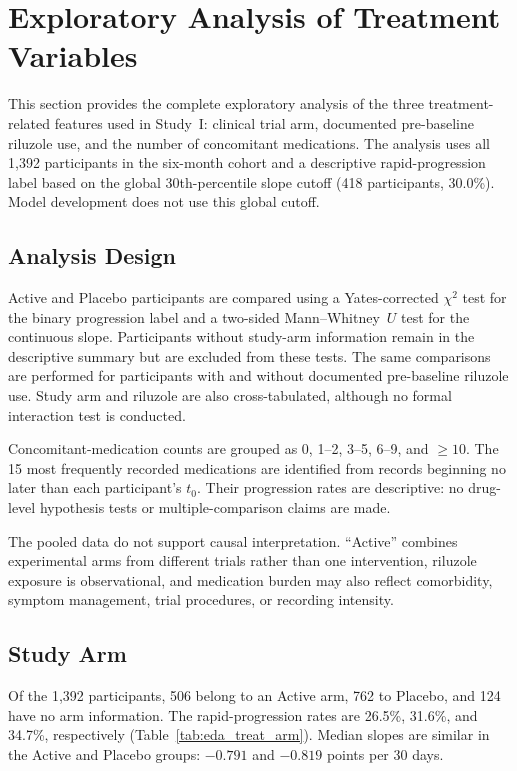 \section{Exploratory Analysis of Treatment Variables}
\label{app:treatment_eda}

This section provides the complete exploratory analysis of the three treatment-related features used in Study~I: clinical trial arm, documented pre-baseline riluzole use, and the number of concomitant medications. The analysis uses all 1{,}392 participants in the six-month cohort and a descriptive rapid-progression label based on the global 30th-percentile slope cutoff (418 participants, 30.0\%). Model development does not use this global cutoff.

\subsection{Analysis Design}
\label{app:treatment_design}

Active and Placebo participants are compared using a Yates-corrected $\chi^2$ test for the binary progression label and a two-sided Mann--Whitney~$U$ test for the continuous slope. Participants without study-arm information remain in the descriptive summary but are excluded from these tests. The same comparisons are performed for participants with and without documented pre-baseline riluzole use. Study arm and riluzole are also cross-tabulated, although no formal interaction test is conducted.

Concomitant-medication counts are grouped as 0, 1--2, 3--5, 6--9, and $\geq10$. The 15 most frequently recorded medications are identified from records beginning no later than each participant's $t_0$. Their progression rates are descriptive: no drug-level hypothesis tests or multiple-comparison claims are made.

The pooled data do not support causal interpretation. ``Active'' combines experimental arms from different trials rather than one intervention, riluzole exposure is observational, and medication burden may also reflect comorbidity, symptom management, trial procedures, or recording intensity.

\subsection{Study Arm}
\label{subsec:results_eda_arm}

Of the 1{,}392 participants, 506 belong to an Active arm, 762 to Placebo, and 124 have no arm information. The rapid-progression rates are 26.5\%, 31.6\%, and 34.7\%, respectively (Table~\ref{tab:eda_treat_arm}). Median slopes are similar in the Active and Placebo groups: $-0.791$ and $-0.819$ points per 30 days.

